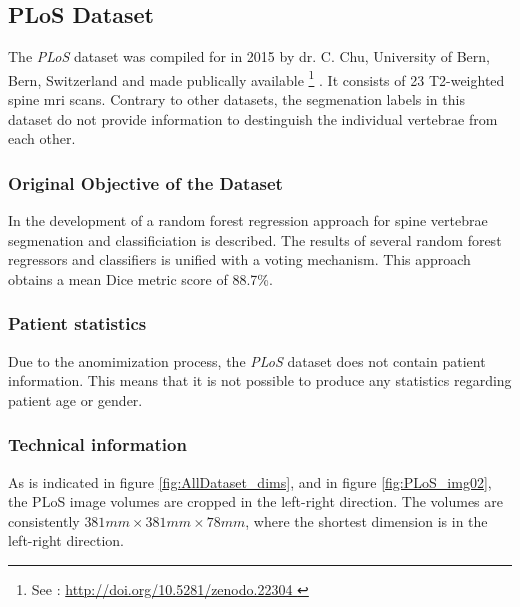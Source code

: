 \subsection{PLoS Dataset}

The \textit{PLoS} dataset was compiled for \cite{Chu2015} in 2015 by dr. C. Chu, University of Bern, Bern, Switzerland and made publically available \footnote{See : \url{ http://doi.org/10.5281/zenodo.22304 }} .
It consists of 23 T2-weighted spine \acrshort{mri} scans. 
Contrary to other datasets, the segmenation labels in this dataset do not provide information to destinguish the individual vertebrae from each other.

\subsubsection{Original Objective of the Dataset}

In \cite{Chu2015} the development of a random forest regression approach for spine vertebrae segmenation and classificiation is described.
The results of several random forest regressors and classifiers is unified with a voting mechanism.
This approach obtains a mean Dice metric score of 88.7\%.

\subsubsection{Patient statistics}

Due to the anomimization process, the \textit{PLoS} dataset does not contain patient information.
This means that it is not possible to produce any statistics regarding patient age or gender.

\subsubsection{Technical information}

As is indicated in figure \ref{fig:AllDataset_dims}, and in figure \ref{fig:PLoS_img02}, the PLoS image volumes are cropped in the left-right direction.
The volumes are consistently $381mm \times 381 mm \times 78 mm$, where the shortest dimension is in the left-right direction.

